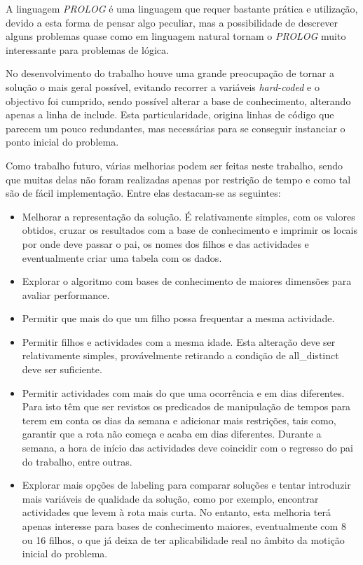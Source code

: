 \documentclass[runningheads]{llncs}
\begin{document}
A linguagem \textit{PROLOG} é uma linguagem que requer bastante prática e utilização, devido a esta forma de pensar algo peculiar, mas a possibilidade de descrever alguns problemas quase como em linguagem natural tornam o \textit{PROLOG} muito interessante para problemas de lógica.

No desenvolvimento do trabalho houve uma grande preocupação de tornar a solução o mais geral possível, evitando recorrer a variáveis \textit{hard-coded} e o objectivo foi cumprido, sendo possível alterar a base de conhecimento, alterando apenas a linha de include. Esta particularidade, origina linhas de código que parecem um pouco redundantes, mas necessárias para se conseguir instanciar o ponto inicial do problema.

Como trabalho futuro, várias melhorias podem ser feitas neste trabalho, sendo que muitas delas não foram realizadas apenas por restrição de tempo e como tal são de fácil implementação. Entre elas destacam-se as seguintes:

\begin{itemize}
	\item Melhorar a representação da solução. É relativamente simples, com os valores obtidos, cruzar os resultados com a base de conhecimento e imprimir os locais por onde deve passar o pai, os nomes dos filhos e das actividades e eventualmente criar uma tabela com os dados.
	\item Explorar o algoritmo com bases de conhecimento de maiores dimensões para avaliar performance.
	\item Permitir que mais do que um filho possa frequentar a mesma actividade.
	\item Permitir filhos e actividades com a mesma idade. Esta alteração deve ser relativamente simples, provávelmente retirando a condição de all\_distinct deve ser suficiente.
	\item Permitir actividades com mais do que uma ocorrência e em dias diferentes. Para isto têm que ser revistos os predicados de manipulação de tempos para terem em conta os dias da semana e adicionar mais restrições, tais como, garantir que a rota não começa e acaba em dias diferentes. Durante a semana, a hora de início das actividades deve coincidir com o regresso do pai do trabalho, entre outras. 
	\item Explorar mais opções de labeling para comparar soluções e tentar introduzir mais variáveis de qualidade da solução, como por exemplo, encontrar actividades que levem à rota mais curta. No entanto, esta melhoria terá apenas interesse para bases de conhecimento maiores, eventualmente com 8 ou 16 filhos, o que já deixa de ter aplicabilidade real no âmbito da motição inicial do problema.
\end{itemize}
\end{document}
